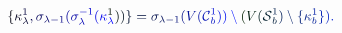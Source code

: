 \documentclass[12pt]{article}
\begin{document}
\makeatletter
\renewcommand*{\@textcolor}[3]{%
  \protect\leavevmode
  \begingroup
    \color#1{#2}#3%
  \endgroup
}
\makeatother
\begin{displaymath}
\mathcolor[RGB]{0,0,15}{\{} \mathcolor[RGB]{0,0,30}{\kappa} _ { \mathcolor[RGB]{0,0,45}{\lambda} } ^ { \mathcolor[RGB]{0,0,60}{1} } \mathcolor[RGB]{0,0,75}{,} \mathcolor[RGB]{0,0,90}{\sigma} _ { \mathcolor[RGB]{0,0,105}{\lambda} \mathcolor[RGB]{0,0,120}{-} \mathcolor[RGB]{0,0,135}{1} } \mathcolor[RGB]{0,0,150}{(} \mathcolor[RGB]{0,0,165}{\sigma} _ { \mathcolor[RGB]{0,0,180}{\lambda} } ^ { \mathcolor[RGB]{0,0,195}{-} \mathcolor[RGB]{0,0,210}{1} } \mathcolor[RGB]{0,0,225}{(} \mathcolor[RGB]{0,0,240}{\kappa} _ { \mathcolor[RGB]{0,0,255}{\lambda} } ^ { \mathcolor[RGB]{0,15,0}{1} } \mathcolor[RGB]{0,15,15}{)} \mathcolor[RGB]{0,15,30}{)} \mathcolor[RGB]{0,15,45}{\}} \mathcolor[RGB]{0,15,60}{=} \mathcolor[RGB]{0,15,75}{\sigma} _ { \mathcolor[RGB]{0,15,90}{\lambda} \mathcolor[RGB]{0,15,105}{-} \mathcolor[RGB]{0,15,120}{1} } \mathcolor[RGB]{0,15,135}{(} \mathcolor[RGB]{0,15,150}{V} \mathcolor[RGB]{0,15,165}{(} \mathcal { \mathcolor[RGB]{0,15,180}{C} } _ { \mathcolor[RGB]{0,15,195}{b} } ^ { \mathcolor[RGB]{0,15,210}{1} } \mathcolor[RGB]{0,15,225}{)} \mathcolor[RGB]{0,15,240}{)} \mathcolor[RGB]{0,15,255}{\setminus} \mathcolor[RGB]{0,30,0}{(} \mathcolor[RGB]{0,30,15}{V} \mathcolor[RGB]{0,30,30}{(} \mathcal { \mathcolor[RGB]{0,30,45}{S} } _ { \mathcolor[RGB]{0,30,60}{b} } ^ { \mathcolor[RGB]{0,30,75}{1} } \mathcolor[RGB]{0,30,90}{)} \mathcolor[RGB]{0,30,105}{\setminus} \mathcolor[RGB]{0,30,120}{\{} \mathcolor[RGB]{0,30,135}{\kappa} _ { \mathcolor[RGB]{0,30,150}{b} } ^ { \mathcolor[RGB]{0,30,165}{1} } \mathcolor[RGB]{0,30,180}{\}} \mathcolor[RGB]{0,30,195}{)} \mathcolor[RGB]{0,30,210}{.}
\end{displaymath}
\end{document}
